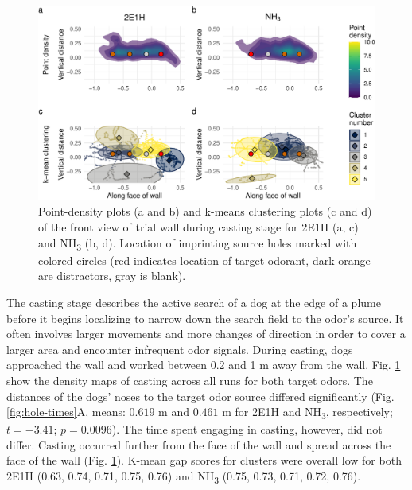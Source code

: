 \documentclass[
]{article}
\begin{document}
\begin{figure}
\centering
\includegraphics{main-manuscript_files/figure-latex/frontwall-casting-1.pdf}
\caption{\label{fig:frontwall-casting}Point-density plots (a and b) and k-means clustering plots (c and d) of the front view of trial wall during casting stage for 2E1H (a, c) and NH\textsubscript{3} (b, d). Location of imprinting source holes marked with colored circles (red indicates location of target odorant, dark orange are distractors, gray is blank).}
\end{figure}

The casting stage describes the active search of a dog at the edge of a plume before it begins localizing to narrow down the search field to the odor's source. It often involves larger movements and more changes of direction in order to cover a larger area and encounter infrequent odor signals. During casting, dogs approached the wall and worked between 0.2 and 1 m away from the wall. Fig. \ref{fig:frontwall-casting} show the density maps of casting across all runs for both target odors. The distances of the dogs' noses to the target odor source differed significantly (Fig. \ref{fig:hole-times}A, means: \(0.619\) m and \(0.461\) m for 2E1H and NH\textsubscript{3}, respectively; \(t = -3.41\); \(p = 0.0096\)). The time spent engaging in casting, however, did not differ. Casting occurred further from the face of the wall and spread across the face of the wall (Fig. \ref{fig:frontwall-casting}). K-mean gap scores for clusters were overall low for both 2E1H (0.63, 0.74, 0.71, 0.75, 0.76) and NH\textsubscript{3} (0.75, 0.73, 0.71, 0.72, 0.76).
\end{document}
